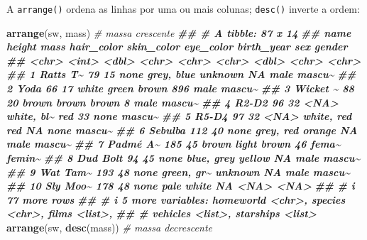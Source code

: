 \documentclass[
  portuguese,
  11pt,
  openany]{book}
\newenvironment{Shaded}{\begin{snugshade}}{\end{snugshade}}
\newcommand{\CommentTok}[1]{\textcolor[rgb]{0.56,0.35,0.01}{\textit{#1}}}
\newcommand{\DocumentationTok}[1]{\textcolor[rgb]{0.56,0.35,0.01}{\textbf{\textit{#1}}}}
\newcommand{\FunctionTok}[1]{\textcolor[rgb]{0.13,0.29,0.53}{\textbf{#1}}}
\newcommand{\NormalTok}[1]{#1}
\newcounter{none} %
\begin{document}
A \texttt{arrange()} ordena as linhas por uma ou mais colunas; \texttt{desc()} inverte a ordem:

\begin{Shaded}
\begin{Highlighting}[]
\FunctionTok{arrange}\NormalTok{(sw, mass)                        }\CommentTok{\# massa crescente}
\DocumentationTok{\#\# \# A tibble: 87 x 14}
\DocumentationTok{\#\#    name     height  mass hair\_color skin\_color eye\_color birth\_year sex   gender}
\DocumentationTok{\#\#    \textless{}chr\textgreater{}     \textless{}int\textgreater{} \textless{}dbl\textgreater{} \textless{}chr\textgreater{}      \textless{}chr\textgreater{}      \textless{}chr\textgreater{}          \textless{}dbl\textgreater{} \textless{}chr\textgreater{} \textless{}chr\textgreater{} }
\DocumentationTok{\#\#  1 Ratts T\textasciitilde{}     79    15 none       grey, blue unknown           NA male  mascu\textasciitilde{}}
\DocumentationTok{\#\#  2 Yoda         66    17 white      green      brown            896 male  mascu\textasciitilde{}}
\DocumentationTok{\#\#  3 Wicket \textasciitilde{}     88    20 brown      brown      brown              8 male  mascu\textasciitilde{}}
\DocumentationTok{\#\#  4 R2{-}D2        96    32 \textless{}NA\textgreater{}       white, bl\textasciitilde{} red               33 none  mascu\textasciitilde{}}
\DocumentationTok{\#\#  5 R5{-}D4        97    32 \textless{}NA\textgreater{}       white, red red               NA none  mascu\textasciitilde{}}
\DocumentationTok{\#\#  6 Sebulba     112    40 none       grey, red  orange            NA male  mascu\textasciitilde{}}
\DocumentationTok{\#\#  7 Padmé A\textasciitilde{}    185    45 brown      light      brown             46 fema\textasciitilde{} femin\textasciitilde{}}
\DocumentationTok{\#\#  8 Dud Bolt     94    45 none       blue, grey yellow            NA male  mascu\textasciitilde{}}
\DocumentationTok{\#\#  9 Wat Tam\textasciitilde{}    193    48 none       green, gr\textasciitilde{} unknown           NA male  mascu\textasciitilde{}}
\DocumentationTok{\#\# 10 Sly Moo\textasciitilde{}    178    48 none       pale       white             NA \textless{}NA\textgreater{}  \textless{}NA\textgreater{}  }
\DocumentationTok{\#\# \# i 77 more rows}
\DocumentationTok{\#\# \# i 5 more variables: homeworld \textless{}chr\textgreater{}, species \textless{}chr\textgreater{}, films \textless{}list\textgreater{},}
\DocumentationTok{\#\# \#   vehicles \textless{}list\textgreater{}, starships \textless{}list\textgreater{}}
\FunctionTok{arrange}\NormalTok{(sw, }\FunctionTok{desc}\NormalTok{(mass))                  }\CommentTok{\# massa decrescente}

\end{Highlighting}
\end{Shaded}
\end{document}

